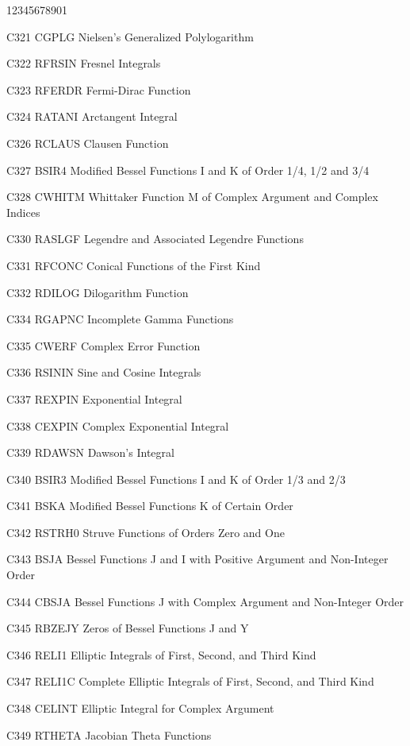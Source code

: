 \begin{DLtt}{12345678901}
\item[C321 CGPLG] Nielsen's Generalized Polylogarithm
\item[C322 RFRSIN] Fresnel Integrals
\item[C323 RFERDR] Fermi-Dirac Function
\item[C324 RATANI] Arctangent Integral
\item[C326 RCLAUS] Clausen Function
\item[C327 BSIR4] Modified Bessel Functions I and K of
Order 1/4, 1/2 and 3/4
\item[C328 CWHITM] Whittaker Function M of Complex Argument and
Complex Indices
\item[C330 RASLGF] Legendre and Associated Legendre Functions
\item[C331 RFCONC] Conical Functions of the First Kind
\item[C332 RDILOG] Dilogarithm Function
\item[C334 RGAPNC] Incomplete Gamma Functions
\item[C335 CWERF] Complex Error Function
\item[C336 RSININ] Sine and Cosine Integrals
\item[C337 REXPIN] Exponential Integral
\item[C338 CEXPIN] Complex Exponential Integral
\item[C339 RDAWSN] Dawson's Integral
\item[C340 BSIR3] Modified Bessel Functions I and K of Order 1/3 and 2/3
\item[C341 BSKA] Modified Bessel Functions K of Certain Order
\item[C342 RSTRH0] Struve Functions of Orders Zero and One
\item[C343 BSJA] Bessel Functions J and I with Positive
Argument and Non-Integer Order
\item[C344 CBSJA] Bessel Functions J with Complex Argument
and Non-Integer Order
\item[C345 RBZEJY] Zeros of Bessel Functions J and Y
\item[C346 RELI1] Elliptic Integrals of First, Second, and Third Kind
\item[C347 RELI1C] Complete Elliptic Integrals of First,
Second, and Third Kind
\item[C348 CELINT] Elliptic Integral for Complex Argument
\item[C349 RTHETA] Jacobian Theta Functions
\end{DLtt}
